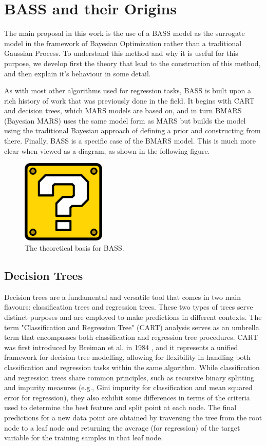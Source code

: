 \chapter{BASS and their Origins}

The main proposal in this work is the use of a BASS model as the surrogate model in the framework of Bayesian Optimization rather than a traditional Gaussian Process. To understand this method and why it is useful for this purpose, we develop first the theory that lead to the construction of this method, and then explain it's behaviour in some detail. 

As with most other algorithms used for regression tasks, BASS is built upon a rich history of work that was previously done in the field. It begins with CART and decision trees, which MARS models are based on, and in turn BMARS (Bayesian MARS) uses the same model form as MARS but builds the model using the traditional Bayesian approach of defining a prior and constructing from there. Finally, BASS is a specific case of the BMARS model. This is much more clear when viewed as a diagram, as shown in the following figure. 

\begin{figure}[h]
	\includegraphics[width=4cm]{Figures/missing.png}
	\centering
	\caption{The theoretical basis for BASS.}
	\label{building_BASS}
\end{figure}

\section{Decision Trees}

Decision trees are a fundamental and versatile tool that comes in two main flavours: classification trees and regression trees. These two types of trees serve distinct purposes and are employed to make predictions in different contexts. The term "Classification and Regression Tree" (CART) analysis serves as an umbrella term that encompasses both classification and regression tree procedures. CART was first introduced by Breiman et al. in 1984 \cite{breiman2017classification}, and it represents a unified framework for decision tree modelling, allowing for flexibility in handling both classification and regression tasks within the same algorithm. While classification and regression trees share common principles, such as recursive binary splitting and impurity measures (e.g., Gini impurity for classification and mean squared error for regression), they also exhibit some differences in terms of the criteria used to determine the best feature and split point at each node. The final predictions for a new data point are obtained by traversing the tree from the root node to a leaf node and returning the average (for regression) of the target variable for the training samples in that leaf node.

